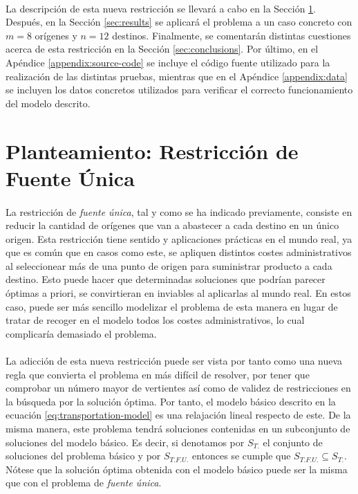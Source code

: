 \documentclass[a4paper, spanish]{article}
\begin{document}
    \paragraph{}
    La descripción de esta nueva restricción se llevará a cabo en la Sección \ref{sec:approach}. Después, en la Sección \ref{sec:results} se aplicará el problema a un caso concreto con $m = 8$ orígenes y $n = 12$ destinos. Finalmente, se comentarán distintas cuestiones acerca de esta restricción en la Sección \ref{sec:conclusions}. Por último, en el Apéndice \ref{appendix:source-code} se incluye el código fuente utilizado para la realización de las distintas pruebas, mientras que en el Apéndice \ref{appendix:data} se incluyen los datos concretos utilizados para verificar el correcto funcionamiento del modelo descrito.

  \section{Planteamiento: Restricción de Fuente Única}
  \label{sec:approach}

    \paragraph{}
    La restricción de \emph{fuente única}, tal y como se ha indicado previamente, consiste en reducir la cantidad de orígenes que van a abastecer a cada destino en un único origen. Esta restricción tiene sentido y aplicaciones prácticas en el mundo real, ya que es común que en casos como este, se apliquen distintos costes administrativos al seleccionear más de una punto de origen para suministrar producto a cada destino. Esto puede hacer que determinadas soluciones que podrían parecer óptimas a priori, se convirtieran en inviables al aplicarlas al mundo real. En estos caso, puede ser más sencillo modelizar el problema de esta manera en lugar de tratar de recoger en el modelo todos los costes administrativos, lo cual complicaría demasiado el problema.

    \paragraph{}
    La adicción de esta nueva restricción puede ser vista por tanto como una nueva regla que convierta el problema en más difícil de resolver, por tener que comprobar un número mayor de vertientes así como de validez de restricciones en la búsqueda por la solución óptima. Por tanto, el modelo básico descrito en la ecuación \eqref{eq:transportation-model} es una relajación lineal respecto de este. De la misma manera, este problema tendrá soluciones contenidas en un subconjunto de soluciones del modelo básico. Es decir, si denotamos por $S_{T.}$ el conjunto de soluciones del problema básico y por $S_{T.F.U.}$ entonces se cumple que $S_{T.F.U.} \subseteq S_{T.}$. Nótese que la solución óptima obtenida con el modelo básico puede ser la misma que con el problema de \emph{fuente única}.
\end{document}
